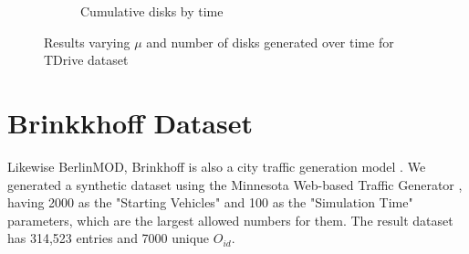 \begin{figure}[h!]
\begin{subfigure}[t]{0.48\textwidth}
        \caption{Cumulative disks by time}
        \label{fig:tdrive_disks}
    \end{subfigure}
    \caption{Results varying $\mu$ and number of disks generated over time for TDrive dataset}
    \label{fig:tdrive_results2}
\end{figure}

\section{Brinkkhoff Dataset}
\label{subsec:brinkhoff}
Likewise BerlinMOD, Brinkhoff is also a city traffic generation model \citep{brinkhoffpaper}. We generated a synthetic
dataset using the Minnesota Web-based Traffic Generator \citep{mntg}, having 2000 as the "Starting Vehicles" and 100 as
the "Simulation Time" parameters, which are the largest allowed numbers for them. The result dataset has 314,523 entries
and 7000 unique $O_{id}$.


